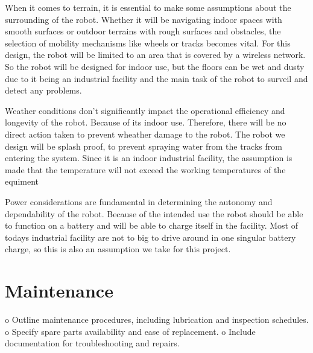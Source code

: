 \documentclass[a4paper]{article}
\begin{document}
When it comes to terrain, it is essential to make some assumptions about the surrounding of the robot. Whether it will be navigating indoor spaces with smooth surfaces or outdoor terrains with rough surfaces and obstacles, the selection of mobility mechanisms like wheels or tracks becomes vital. For this design, the robot will be limited to an area that is covered by a wireless network. So the robot will be designed for indoor use, but the floors can be wet and dusty due to it being an industrial facility and the main task of the robot to surveil and detect any problems.

Weather conditions don't significantly impact the operational efficiency and longevity of the robot. Because of its indoor use. Therefore, there will be no direct action taken to prevent wheather damage to the robot. The robot we design will be splash proof, to prevent spraying water from the tracks from entering the system. Since it is an indoor industrial facility, the assumption is made that the temperature will not exceed the working temperatures of the equiment

Power considerations are fundamental in determining the autonomy and dependability of the robot. Because of the intended use the robot should be able to function on a battery and will be able to charge itself in the facility. Most of todays industrial facility are not to big to drive around in one singular battery charge, so this is also an assumption we take for this project.

\section*{Maintenance}
o	Outline maintenance procedures, including lubrication and inspection schedules.
o	Specify spare parts availability and ease of replacement.
o	Include documentation for troubleshooting and repairs. 





\end{document}
